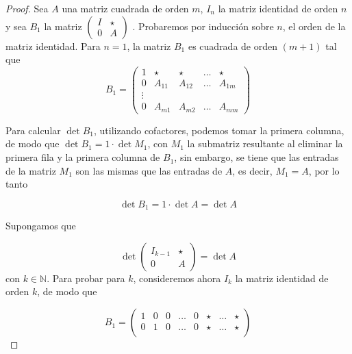 \documentclass[11pt]{article}
\theoremstyle{definition} %
\begin{document}
\begin{proof} Sea $A$ una matriz cuadrada de orden $m$, $I_n$ la matriz identidad de orden $n$ y sea $B_1$ la matriz $\begin{pmatrix}

    I & \star \\

    0 & A

\end{pmatrix}$ . Probaremos por inducción sobre $n$, el orden de la matriz identidad. Para $n=1$,  la matriz $B_1$ es cuadrada de orden $(m+1)$ tal que
\[
  B_1 = \begin{pmatrix}

      1 & \star & \star & \dots & \star \\

      0 & A_{11} & A_{12} & \dots & A_{1m} \\

      \vdots \\

      0 & A_{m1} & A_{m2} & \dots & A_{mm}

  \end{pmatrix}
\]

Para calcular $\det B_1$, utilizando cofactores, podemos tomar la primera columna, de modo que $\det B_1 = 1 \cdot \det M_1$, con $M_1$ la submatriz resultante al eliminar la primera fila y la primera columna de $B_1$, sin embargo, se tiene que las entradas de la matriz $M_1$ son las mismas que las entradas de $A$, es decir, $M_1=A$, por lo tanto

\[
\det B_1 = 1 \cdot \det A = \det A
\]

Supongamos que 

\[
\det \begin{pmatrix}

    I_{k-1} & \star \\

    0 & A

\end{pmatrix} = \det A
\]con $k \in \mathbb{N}$. Para probar para $k$, consideremos ahora $I_k$ la matriz identidad de orden $k$, de modo que



\[
B_1 = \begin{pmatrix}

    1 & 0 & 0 & \dots & 0 & \star & \dots & \star \\

    0 & 1 & 0 & \dots & 0 & \star & \dots & \star \\


\end{pmatrix}\]
\end{proof}
\end{document}

